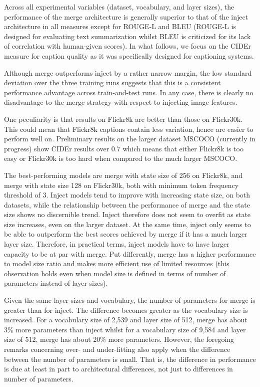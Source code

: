 \documentclass[11pt,letterpaper]{article}
\begin{document}
Across all experimental variables (dataset, vocabulary, and layer sizes), the performance of the merge architecture is generally superior to that of the inject architecture in all measures except for ROUGE-L and BLEU (ROUGE-L is designed for evaluating text summarization whilst BLEU is criticized for its lack of correlation with human-given scores). In what follows, we focus on the CIDEr measure for caption quality as it was specifically designed for captioning systems.

Although merge outperforms inject by a rather narrow margin, the low standard deviation over the three training runs suggests that this is a consistent performance advantage across train-and-test runs. In any case, there is clearly no disadvantage to the merge strategy with respect to injecting image features.

One peculiarity is that results on Flickr8k are better than those on Flickr30k. This could mean that Flickr8k captions contain less variation, hence are easier to perform well on. Preliminary results on the larger dataset MSCOCO \cite{Lin2014} (currently in progress) show CIDEr results over 0.7 which means that either Flickr8k is too easy or Flickr30k is too hard when compared to the much larger MSCOCO.

The best-performing models are merge with state size of 256 on Flickr8k, and merge with state size 128 on Flickr30k, both with minimum token frequency threshold of 3. Inject models tend to improve with increasing state size, on both datasets, while the relationship between the performance of merge and the state size shows no discernible trend. Inject therefore does not seem to overfit as state size increases, even on the larger dataset. At the same time, inject only seems to be able to outperform the best scores achieved by merge if it has a much larger layer size. Therefore, in practical terms, inject models have to have larger capacity to be at par with merge. Put differently, merge has a higher performance to model size ratio and makes more efficient use of limited resources (this observation holds even when model size is defined in terms of number of parameters instead of layer sizes).

Given the same layer sizes and vocabulary, the number of parameters for merge is greater than for inject. The difference becomes greater as the vocabulary size is increased. For a vocabulary size of 2,539 and layer size of 512, merge has about 3\% more parameters than inject whilst for a vocabulary size of 9,584 and layer size of 512, merge has about 20\% more parameters. However, the foregoing remarks concerning over- and under-fitting also apply when the difference between the number of parameters is small. That is, the difference in performance is due at least in part to architectural differences, not just to differences in number of parameters.
\end{document}
